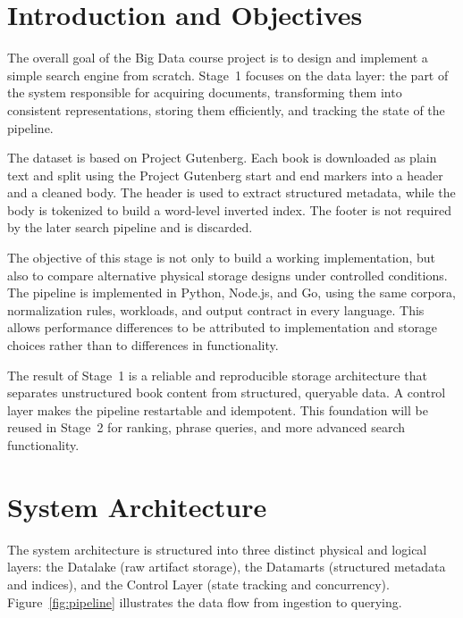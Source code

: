 \documentclass[12pt,a4paper]{article}
\begin{document}
	\setcounter{section}{1}
	
	\section{Introduction and Objectives}
	The overall goal of the Big Data course project is to design and implement a simple
	search engine from scratch. Stage~1 focuses on the data layer: the part of the system
	responsible for acquiring documents, transforming them into consistent representations,
	storing them efficiently, and tracking the state of the pipeline.
	
	The dataset is based on Project Gutenberg. Each book is downloaded as plain text and
	split using the Project Gutenberg start and end markers into a header and a cleaned body.
	The header is used to extract structured metadata, while the body is tokenized to build
	a word-level inverted index. The footer is not required by the later search pipeline and
	is discarded.
	
	The objective of this stage is not only to build a working implementation, but also to
	compare alternative physical storage designs under controlled conditions. The pipeline is
	implemented in Python, Node.js, and Go, using the same corpora, normalization rules,
	workloads, and output contract in every language. This allows performance differences to
	be attributed to implementation and storage choices rather than to differences in
	functionality.
	
	The result of Stage~1 is a reliable and reproducible storage architecture that separates
	unstructured book content from structured, queryable data. A control layer makes the
	pipeline restartable and idempotent. This foundation will be reused in Stage~2 for
	ranking, phrase queries, and more advanced search functionality.
	
	\section{System Architecture}
	\label{sec:architecture}
	The system architecture is structured into three distinct physical and logical layers:
	the Datalake (raw artifact storage), the Datamarts (structured metadata and indices),
	and the Control Layer (state tracking and concurrency). Figure~\ref{fig:pipeline}
	illustrates the data flow from ingestion to querying.
	
\end{document}
